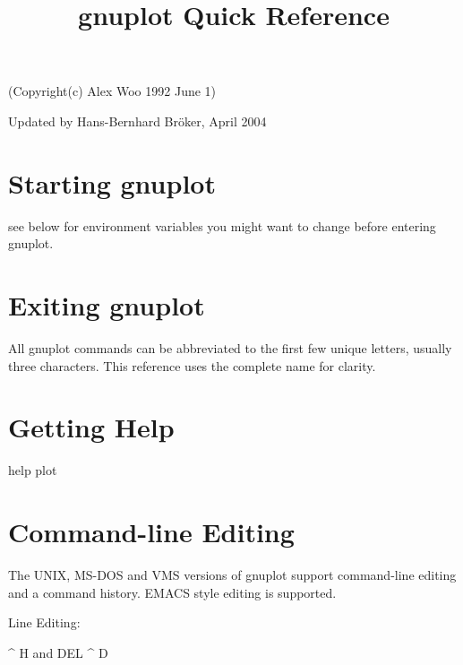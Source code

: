 

\title{gnuplot Quick Reference}

\centerline{(Copyright(c) Alex Woo 1992 June 1)}
\centerline{Updated by Hans-Bernhard Br\"o{}ker, April 2004}

\section{Starting gnuplot}


see below for  environment variables you might want to change
before entering gnuplot.

\section{Exiting gnuplot}


All gnuplot commands can be abbreviated to the first few
unique letters, usually three characters.  This reference uses
the complete name for clarity.

\section{Getting Help}

 {help plot}
\section{Command-line Editing}

The UNIX, MS-DOS and VMS versions of gnuplot support command-line
editing and a command history.  EMACS style editing is supported.

\beginindentedkeys

Line Editing:

 {^ H and DEL }
  {^ D}
\endindentedkeys
\beginindentedkeys


